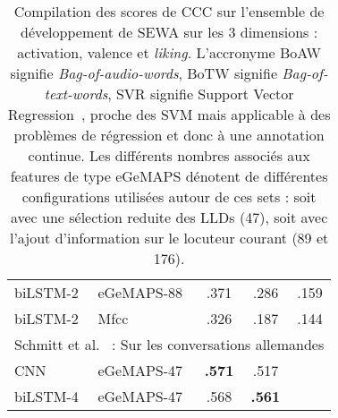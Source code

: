 \begin{table}[]
\begin{tabular}{| l | l | c | c | c |}
        \hline
        biLSTM-2 &eGeMAPS-88  &.371 &.286 &.159 \\
        biLSTM-2 &Mfcc        &.326 &.187 &.144 \\
         \hline
       \multicolumn{5}{|l|}{Schmitt et al.~\cite{Schmitt2019} : Sur les conversations allemandes} \\
       \hline
       CNN      &eGeMAPS-47    &\textbf{.571}  &.517 & \\
       biLSTM-4 &eGeMAPS-47    &.568  &\textbf{.561} & \\
       \hline
    \end{tabular}
    \caption{Compilation des scores de CCC sur l'ensemble de développement de SEWA sur les 3 dimensions : activation, valence et \textit{liking}. L'accronyme BoAW signifie \textit{Bag-of-audio-words}, BoTW signifie \textit{Bag-of-text-words}, SVR signifie Support Vector Regression~\cite{Smola2004}, proche des SVM mais applicable à des problèmes de régression et donc à une annotation continue. Les différents nombres associés aux features de type eGeMAPS dénotent de différentes configurations utilisées autour de ces sets : soit avec une sélection reduite des LLDs (47), soit avec l'ajout d'information sur le locuteur courant (89 et 176).}
    \label{tab:avec}
\end{table}
